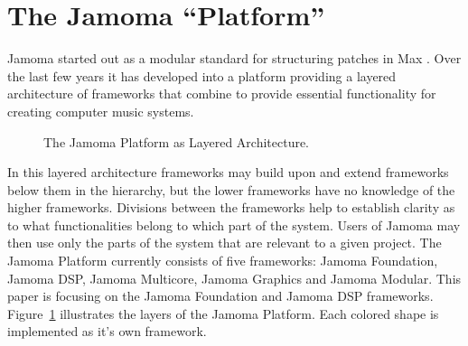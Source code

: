 \documentclass[twoside,10pt]{article}
\begin{document}





\section{The Jamoma ``Platform''} %

Jamoma started out as a modular standard for structuring patches in Max \cite{Place:2006}. Over the last few years it has developed into a platform providing a layered architecture of frameworks that combine to provide essential functionality for creating computer music systems.  

\begin{figure}[htbp]
\centerline{}
\caption{The Jamoma Platform as Layered Architecture.}
\label{fig:layers}
\end{figure}

In this layered architecture frameworks may build upon and extend frameworks below them in the hierarchy, but the lower frameworks have no knowledge of the higher frameworks.  Divisions between the frameworks help to establish clarity as to what functionalities belong to which part of the system.  Users of Jamoma may then use only the parts of the system that are relevant to a given project.  The Jamoma Platform currently consists of five frameworks: Jamoma Foundation, Jamoma DSP, Jamoma Multicore, Jamoma Graphics and Jamoma Modular. This paper is focusing on the Jamoma Foundation and Jamoma DSP frameworks. Figure~\ref{fig:layers} illustrates the layers of the Jamoma Platform.  Each colored shape is implemented as it's own framework.
\end{document}
